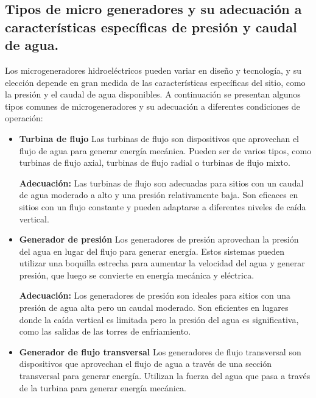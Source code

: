 \documentclass[11pt]{article}
\begin{document}
            \subsection{Tipos de micro generadores y su adecuación a características específicas de
            presión y caudal de agua.}
            Los microgeneradores hidroeléctricos pueden variar en diseño y tecnología, y su elección
            depende en gran medida de las características específicas del sitio, como la presión y el
            caudal de agua disponibles. A continuación se presentan algunos tipos comunes de
            microgeneradores y su adecuación a diferentes condiciones de operación:

            \begin{itemize}
                \item \textbf{Turbina de flujo} Las turbinas de flujo son dispositivos que aprovechan el flujo de agua para
                generar energía mecánica. Pueden ser de varios tipos, como turbinas de flujo axial, turbinas
                de flujo radial o turbinas de flujo mixto.
                
                \textbf{Adecuación:} Las turbinas de flujo son adecuadas para sitios con un caudal de agua
                moderado a alto y una presión relativamente baja. Son eficaces en sitios con un flujo
                constante y pueden adaptarse a diferentes niveles de caída vertical.
                
                \item  \textbf{Generador de presión}
                Los generadores de presión aprovechan la presión del agua en lugar del flujo
                para generar energía. Estos sistemas pueden utilizar una boquilla estrecha para aumentar
                la velocidad del agua y generar presión, que luego se convierte en energía mecánica y
                eléctrica.

                \textbf{Adecuación: }Los generadores de presión son ideales para sitios con una presión de agua
                alta pero un caudal moderado. Son eficientes en lugares donde la caída vertical es limitada
                pero la presión del agua es significativa, como las salidas de las torres de enfriamiento.
                
                \item \textbf{Generador de flujo transversal}
                Los generadores de flujo transversal son dispositivos que aprovechan el flujo
                de agua a través de una sección transversal para generar energía. Utilizan la fuerza del
                agua que pasa a través de la turbina para generar energía mecánica.
                

\end{itemize}
\end{document}
